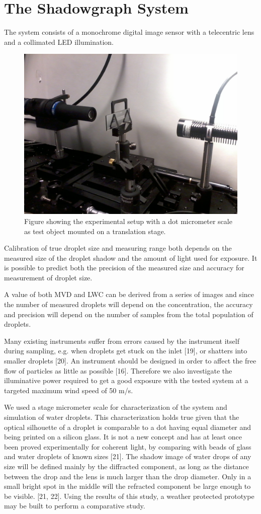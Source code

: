 \section{The Shadowgraph System}

The system consists of a monochrome digital image sensor with a telecentric lens and a collimated LED illumination.

\begin{figure}%
\centering\includegraphics[width=0.6\linewidth]{figures/Foto0169}
\caption{Figure showing the experimental setup with a dot micrometer scale as test object mounted on a translation stage.}
\end{figure}

Calibration of true droplet size and measuring range both depends on the measured size of the droplet shadow and the amount of light used for exposure. It is possible to predict both the precision of the measured size and accuracy for measurement of droplet size. 

A value of both MVD and LWC can be derived from a series of images and since the number of measured droplets will depend on the concentration, the accuracy and precision will depend on the number of samples from the total population of droplets. 

Many existing instruments suffer from errors caused by the instrument itself during sampling, e.g. when droplets get stuck on the inlet [19], or shatters into smaller droplets [20]. An instrument should be designed in order to affect the free flow of particles as little as possible [16]. Therefore we also investigate the illuminative power required to get a good exposure with the tested system at a targeted maximum wind speed of 50 m/s.

We used a stage micrometer scale for characterization of the system and simulation of water droplets. This characterization holds true given that the optical silhouette of a droplet is comparable to a dot having equal diameter and being printed on a silicon glass. It is not a new concept and has at least once been proved experimentally for coherent light, by comparing with beads of glass and water droplets of known sizes [21]. The shadow image of water drops of any size will be defined mainly by the diffracted component, as long as the distance between the drop and the lens is much larger than the drop diameter. Only in a small bright spot in the middle will the refracted component be large enough to be visible. [21, 22]. 
Using the results of this study, a weather protected prototype may be built to perform a comparative study.


